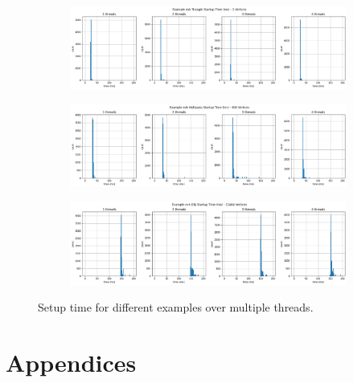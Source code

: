 \documentclass[12pt]{report}
\theoremstyle{definition}
\begin{document}
{    \begin{figure}
      \begin{subfigure}[b]{\textwidth}
        \includegraphics[width=\textwidth]{images/triangle_setup.png}
      \end{subfigure}
      \begin{subfigure}[b]{\textwidth}
        \includegraphics[width=\textwidth]{images/multipass_setup.png}
      \end{subfigure}
      \begin{subfigure}[b]{\textwidth}
        \includegraphics[width=\textwidth]{images/obj_setup.png}
      \end{subfigure}
      \caption{Setup time for different examples over multiple threads.}
      \label{fig:setup}                        
    \end{figure}
    
    \clearpage
  }

  
  

  \chapter*{Appendices}
  
\end{document}
